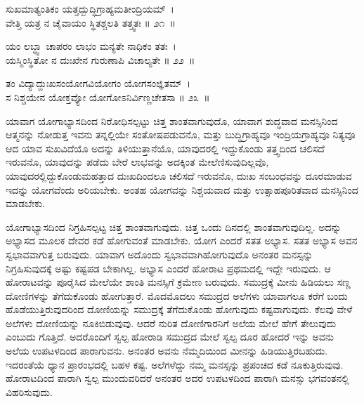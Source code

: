 \begin{shloka}
ಸುಖಮಾತ್ಯಂತಿಕಂ ಯತ್ತದ್ಬುದ್ಧಿಗ್ರಾಹ್ಯಮತೀಂದ್ರಿಯಮ್~।\\ವೇತ್ತಿ ಯತ್ರ ನ ಚೈವಾಯಂ ಸ್ಥಿತಶ್ಚಲತಿ ತತ್ತ್ವತಃ \hfill॥ ೨೧~॥
\end{shloka}

\begin{shloka}
ಯಂ ಲಬ್ಧ್ವಾ ಚಾಪರಂ ಲಾಭಂ ಮನ್ಯತೇ ನಾಧಿಕಂ ತತಃ~।\\ಯಸ್ಮಿಂಸ್ಥಿತೋ ನ ದುಃಖೇನ ಗುರುಣಾಪಿ ವಿಚಾಲ್ಯತೇ \hfill॥ ೨೨~॥
\end{shloka}

\begin{shloka}
ತಂ ವಿದ್ಯಾದ್ದುಃಖಸಂಯೋಗವಿಯೋಗಂ ಯೋಗಸಂಜ್ಞಿತಮ್~।\\ಸ ನಿಶ್ಚಯೇನ ಯೋಕ್ತವ್ಯೋ ಯೋಗೋಽನಿರ್ವಿಣ್ಣಚೇತಸಾ \hfill॥ ೨೩~॥
\end{shloka}

\begin{artha}
ಯಾವಾಗ ಯೋಗಾಭ್ಯಾಸದಿಂದ ನಿರೋಧಿಸಲ್ಪಟ್ಟು ಚಿತ್ತ ಶಾಂತವಾಗುವುದೊ, ಯಾವಾಗ ಶುದ್ಧವಾದ ಮನಸ್ಸಿನಿಂದ ಆತ್ಮನನ್ನು ನೋಡುತ್ತ ಇವನು ತನ್ನಲ್ಲಿಯೇ ಸಂತೋಷಪಡುವನೊ, ಮತ್ತು ಬುದ್ಧಿಗ್ರಾಹ್ಯವೂ ಇಂದ್ರಿಯಗ್ರಾಹ್ಯವೂ ನಿತ್ಯವೂ ಆದ ಯಾವ ಸುಖವಿದೆಯೊ ಅದನ್ನು ತಿಳಿಯು\-ತ್ತಾನೆಯೊ, ಯಾವುದರಲ್ಲಿ ಇದ್ದುಕೊಂಡು ತತ್ತ್ವದಿಂದ ಚಲಿಸದೆ ಇರುವನೊ, ಯಾವುದನ್ನು ಪಡೆದು ಬೇರೆ ಲಾಭವನ್ನು ಅದಕ್ಕಿಂತ ಮೇಲೆಣಿಸುವುದಿಲ್ಲವೊ, ಯಾವುದರಲ್ಲಿದ್ದುಕೊಂಡು\break ಮಹತ್ತಾದ ದುಃಖದಿಂದಲೂ ಚಲಿಸದೆ ಇರುವನೊ, ದುಃಖ ಸಂಬಂಧವನ್ನು ದೂರಮಾಡುವ ಇದನ್ನು ಯೋಗವೆಂದು ಅರಿಯಬೇಕು. ಅಂತಹ ಯೋಗವನ್ನು ನಿಶ್ಚಯವಾದ ಮತ್ತು ಉತ್ಸಾಹ\-ಪೂರಿತವಾದ ಮನಸ್ಸಿನಿಂದ ಮಾಡಬೇಕು.
\end{artha}

ಯೋಗಾಭ್ಯಾಸದಿಂದ ನಿಗ್ರಹಿಸಲ್ಪಟ್ಟ ಚಿತ್ತ ಶಾಂತವಾಗುವುದು. ಚಿತ್ತ ಒಂದು ದಿನದಲ್ಲಿ ಶಾಂತವಾಗುವುದಿಲ್ಲ. ಅದನ್ನು ಅಭ್ಯಾಸದ ಮೂಲಕ ದೇವರ ಕಡೆ ಹೋಗುವಂತೆ ಮಾಡಬೇಕು. ಯೋಗ ಎಂದರೆ ಸತತ ಅಭ್ಯಾಸ. ಸತತ ಅಭ್ಯಾಸ ಅವನ ಸ್ವಭಾವವಾಗುತ್ತ ಬರುವುದು. ಯಾವಾಗ ಅದೊಂದು ಸ್ವಭಾವವಾಗಿಹೋಗುವುದೊ ಅನಂತರ ಮನಸ್ಸನ್ನು ನಿಗ್ರಹಿಸುವುದಕ್ಕೆ ಅಷ್ಟು ಕಷ್ಟಪಡ ಬೇಕಾಗಿಲ್ಲ. ಅಭ್ಯಾಸ ಎಂದರೆ ಹೋರಾಟ ಪ್ರಥಮದಲ್ಲಿ ಇದ್ದೇ ಇರುವುದು. ಆ ಹೋರಾಟವನ್ನು ಪೂರೈಸಿದ ಮೇಲೆಯೇ ಶಾಂತಿ ಮನಸ್ಸಿಗೆ ಕ್ರಮೇಣ ಬರುವುದು. ಸಮುದ್ರಕ್ಕೆ ಮೀನು ಹಿಡಿಯಲು ಸಣ್ಣ ದೋಣಿಗಳನ್ನು ತೆಗೆದುಕೊಂಡು ಹೋಗುತ್ತಾರೆ. ಮೊದಮೊದಲು ಸಮುದ್ರದ ಅಲೆಗಳು ಯಾವಾಗಲೂ ಕರೆಗೆ ಬಂದು ಹೊಡೆಯುತ್ತಿರುವುದರಿಂದ ದೋಣಿಯನ್ನು ಸಮುದ್ರಕ್ಕೆ ತೆಗೆದುಕೊಂಡು ಹೋಗುವುದು ಕಷ್ಟವಾಗುವುದು. ಕೆಲವು ವೇಳೆ ಅಲೆಗಳು ದೋಣಿಯನ್ನು ನೂಕಿಬಿಡುವುವು. ಆದರೆ ನುರಿತ ದೋಣಿಗಾರನಿಗೆ ಅಲೆಯ ಮೇಲೆ ಹೇಗೆ ತೇಲುವುದು ಎಂಬುದು ಗೊತ್ತಿದೆ. ಅದರೊಂದಿಗೆ ಸ್ವಲ್ಪ ಹೋರಾಡಿ ಸಮುದ್ರದ ಮೇಲೆ ಸ್ವಲ್ಪ ದೂರ ಹೋದರೆ ಇನ್ನು ಅವನು ಅಲೆಯ ಉಪಟಳದಿಂದ ಪಾರಾಗುವನು. ಅನಂತರ ಅವನು ನೆಮ್ಮದಿಯಿಂದ ಮೀನನ್ನು ಹಿಡಿಯುತ್ತಿರಬಹುದು. ಇದರಂತೆಯೆ ಧ್ಯಾನ ಪ್ರಾರಂಭದಲ್ಲಿ ಬಹಳ ಕಷ್ಟ. ಅಲೆಗಳೆದ್ದು ನಮ್ಮ ಮನಸ್ಸನ್ನು ಪ್ರಪಂಚದ ಕಡೆ ನೂಕುತ್ತಿರುವುವು. ಹೋರಾಟದಿಂದ ಪಾರಾಗಿ ಸ್ವಲ್ಪ ಮುಂದುವರಿದರೆ ಅನಂತರ ಅದರ ಉಪಟಳದಿಂದ ಪಾರಾಗಿ ಮನಸ್ಸು ಭಗವಂತನಲ್ಲಿ ವಿಹರಿಸುವುದು.

